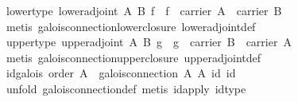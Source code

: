 \begin{isabellebody}
\endisatagproof
{\isafoldproof}%
%
\isadelimproof
\isanewline
%
\endisadelimproof
\isanewline
{}\isamarkupfalse%
\ lower{}type{}\ {}lower{}adjoint\ A\ B\ f\ {}\ f\ {}\ carrier\ A\ {}\ carrier\ B{}\isanewline
%
\isadelimproof
\ \ %
\endisadelimproof
%
\isatagproof
{}\isamarkupfalse%
\ {}metis\ galois{}connection{}lower{}closure\ lower{}adjoint{}def{}%
\endisatagproof
{\isafoldproof}%
%
\isadelimproof
\isanewline
%
\endisadelimproof
\isanewline
{}\isamarkupfalse%
\ upper{}type{}\ {}upper{}adjoint\ A\ B\ g\ {}\ g\ {}\ carrier\ B\ {}\ carrier\ A{}\isanewline
%
\isadelimproof
\ \ %
\endisadelimproof
%
\isatagproof
{}\isamarkupfalse%
\ {}metis\ galois{}connection{}upper{}closure\ upper{}adjoint{}def{}%
\endisatagproof
{\isafoldproof}%
%
\isadelimproof
\isanewline
%
\endisadelimproof
\isanewline
{}\isamarkupfalse%
\ id{}galois{}\ {}order\ A\ {}\ galois{}connection\ A\ A\ id\ id{}\isanewline
%
\isadelimproof
\ \ %
\endisadelimproof
%
\isatagproof
{}\isamarkupfalse%
\ {}unfold\ galois{}connection{}def{}\ metis\ id{}apply\ id{}type{}%

\end{isabellebody}
